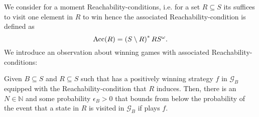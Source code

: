 We consider for a moment Reachability-conditions, i.e. for a set
$R\subseteq S$ its suffices to visit one element in $R$ to win hence the 
associated Reachability-condition is defined as 
\begin{equation*}
  \operatorname{Acc}(R) = \left(S\setminus R\right)^{*}RS^{\omega}.
\end{equation*}
We introduce an observation about winning games with associated 
Reachability-conditions:
\begin{proposition}
  Given $B\subseteq S$ and $R\subseteq S$ such that \eve{} has a positively
  winning strategy $f$ in $\mathcal{G}_{B}$ equipped with the 
  Reachability-condition that $R$ induces. Then, there is an $N\in\mathbb{N}$
  and some probability $\epsilon_{B} > 0$ that bounds from below the 
  probability of the event that a state in $R$ is visited in 
  $\mathcal{G}_{B}$ if \eve{} plays $f$.
\end{proposition}
